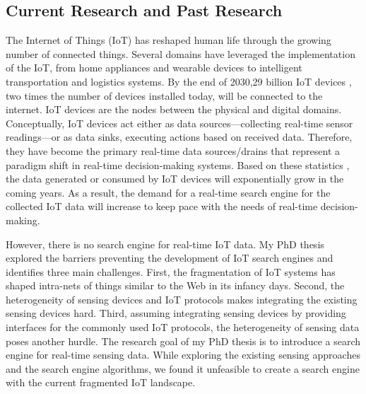 \documentclass[10pt, letterpaper]{article}
\begin{document}
\subsection*{Current Research and Past Research}
The Internet of Things (IoT) has reshaped human life through the growing number of connected things. Several domains have leveraged the implementation of the IoT, from home appliances and wearable devices to intelligent transportation and logistics systems. By the end of 2030,29 billion IoT devices \cite{explodingtopics2024iot}, two times the number of devices installed today, will be connected to the internet. IoT devices are the nodes between the physical and digital domains. Conceptually, IoT devices \cite{elgazzar2022revisiting} act either as data sources—collecting real-time sensor readings—or as data sinks, executing actions based on received data. Therefore, they have become the primary real-time data sources/drains that represent a paradigm shift in real-time decision-making systems. Based on these statistics \cite{explodingtopics2024iot}, the data generated or consumed by IoT devices will exponentially grow in the coming years. As a result, the demand for a real-time search engine for the collected IoT data will increase to keep pace with the needs of real-time decision-making. \vspace{0.2cm}


However, there is no search engine for real-time IoT data. My PhD thesis explored the barriers preventing the development of IoT search engines and identifies three main challenges. First, the fragmentation of IoT systems has shaped intra-nets of things similar to the Web in its infancy days. Second, the heterogeneity of sensing devices and IoT protocols makes integrating the existing sensing devices hard. Third, assuming integrating sensing devices by providing interfaces for the commonly used IoT protocols, the heterogeneity of sensing data poses another hurdle. \vspace{0.2cm}
The research goal of my PhD thesis is to introduce a search engine for real-time sensing data. While exploring the existing sensing approaches and the search engine algorithms, we found it unfeasible to create a search engine with the current fragmented IoT landscape. \vspace{0.2cm}
\end{document}
